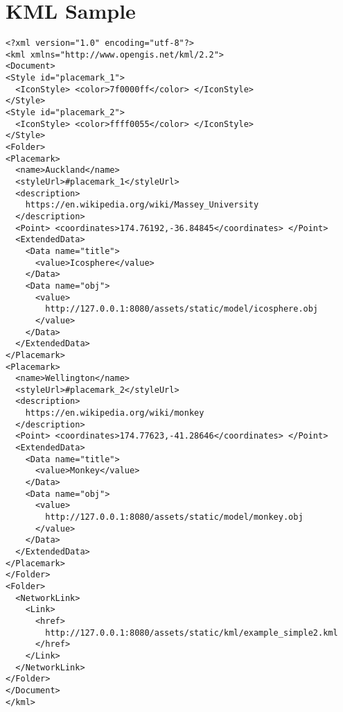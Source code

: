 \chapter{KML Sample}
\label{appendix-kml-sample}

\begin{lstlisting}[language=Kml]
<?xml version="1.0" encoding="utf-8"?>
<kml xmlns="http://www.opengis.net/kml/2.2">
<Document>
<Style id="placemark_1">
  <IconStyle> <color>7f0000ff</color> </IconStyle> 
</Style>
<Style id="placemark_2">
  <IconStyle> <color>ffff0055</color> </IconStyle> 
</Style>
<Folder>
<Placemark>
  <name>Auckland</name>
  <styleUrl>#placemark_1</styleUrl>
  <description>
    https://en.wikipedia.org/wiki/Massey_University
  </description>
  <Point> <coordinates>174.76192,-36.84845</coordinates> </Point>
  <ExtendedData>
    <Data name="title">
      <value>Icosphere</value>
    </Data>
    <Data name="obj">
      <value>
        http://127.0.0.1:8080/assets/static/model/icosphere.obj
      </value>
    </Data>
  </ExtendedData>
</Placemark>
<Placemark>
  <name>Wellington</name>
  <styleUrl>#placemark_2</styleUrl>
  <description>
    https://en.wikipedia.org/wiki/monkey
  </description>
  <Point> <coordinates>174.77623,-41.28646</coordinates> </Point>
  <ExtendedData>
    <Data name="title">
      <value>Monkey</value>
    </Data>
    <Data name="obj">
      <value>
        http://127.0.0.1:8080/assets/static/model/monkey.obj
      </value>
    </Data>
  </ExtendedData>
</Placemark>
</Folder>
<Folder>
  <NetworkLink>
    <Link> 
      <href>
        http://127.0.0.1:8080/assets/static/kml/example_simple2.kml
      </href> 
    </Link>
  </NetworkLink>
</Folder>
</Document>
</kml>
\end{lstlisting}

